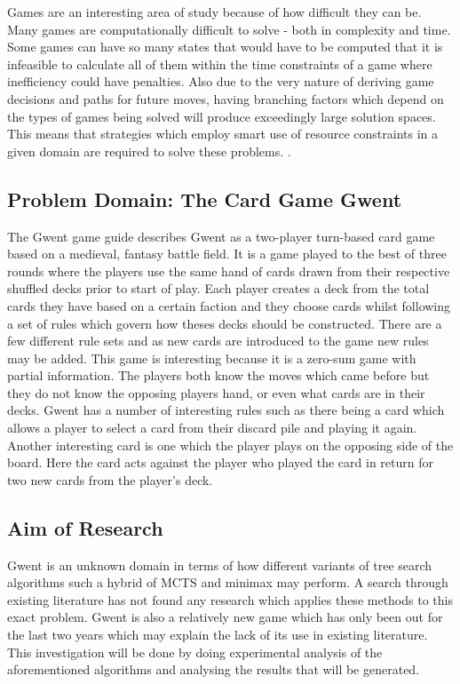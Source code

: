 \documentclass [11pt]{article}
\begin{document}
	\noindent Games are an interesting area of study because of how difficult they can be. Many games are computationally difficult to solve - both in complexity and time. Some games can have so many states that would have to be computed that it is infeasible to calculate all of them within the time constraints of a game where inefficiency could have penalties. Also due to the very nature of deriving game decisions and paths for future moves, having branching factors which depend on the types of games being solved will produce exceedingly large solution spaces. This means that strategies which employ smart use of resource constraints in a given domain are required to solve these problems. \cite{AIModern}. \\
	
	\subsection{Problem Domain: The Card Game Gwent}
	The Gwent game guide \cite{guide} describes Gwent as a two-player turn-based card game based on a medieval, fantasy battle field. It is a game played to the best of three rounds where the players use the same hand of cards drawn from their respective shuffled decks prior to start of play. Each player creates a deck from the total cards they have based on a certain faction and they choose cards whilst following a set of rules which govern how theses decks should be constructed. There are a few different rule sets and as new cards are introduced to the game new rules may be added. This game is interesting because it is a zero-sum game with partial information. The players both know the moves which came before but they do not know the opposing players hand, or even what cards are in their decks. Gwent has a number of interesting rules such as there being a card which allows a player to select a card from their discard pile and playing it again. Another interesting card is one which the player plays on the opposing side of the board. Here the card acts against the player who played the card in return for two new cards from the player’s deck.
	
	\subsection{Aim of Research}
	Gwent is an unknown domain in terms of how different variants of tree search algorithms such a hybrid of MCTS and minimax may perform. A search through existing literature has not found any research which applies these methods to this exact problem. Gwent is also a relatively new game which has only been out for the last two years which may explain the lack of its use in existing literature. This investigation will be done by doing experimental analysis of the aforementioned algorithms and analysing the results that will be generated. 
	
\end{document}
